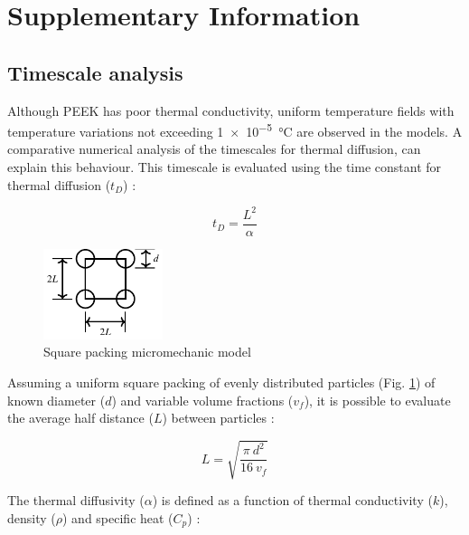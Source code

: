 \documentclass[11pt,review,times]{elsarticle}
\begin{document}
\FloatBarrier
\clearpage
							\section*{Supplementary Information}
\subsection*{Timescale analysis}
\FloatBarrier

Although PEEK has poor thermal conductivity, uniform temperature fields with temperature variations not exceeding \SI{1e-5}{\celsius} are observed in the models. 
A comparative numerical analysis of the timescales for thermal diffusion, can explain this behaviour. 
This timescale is evaluated using the time constant for thermal diffusion ($t_D$) : 

\begin{equation}
	t_D = \frac{L^2}{\alpha}
	\label{equa:time_constant}
\end{equation}

\begin{figure}[htb]
	\center
	\captionsetup{width=35mm}
	\includegraphics[width=35mm]{arrangement_carre}
	\caption{Square packing micromechanic model}
	\label{fig:square_packing}
\end{figure}

Assuming a uniform square packing of evenly distributed particles (Fig. \ref{fig:square_packing}) of known diameter ($d$) and variable volume fractions ($v_f$), it is possible to evaluate the average half distance ($L$) between particles :

\begin{equation}
	L = \sqrt{\frac{\pi \ d^2}{16 \ v_f}}
	\label{equa:L_average}
\end{equation}

The thermal diffusivity ($\alpha$) is defined as a function of thermal conductivity ($k$), density ($\rho$) and specific heat ($C_p$) : 
\end{document}
